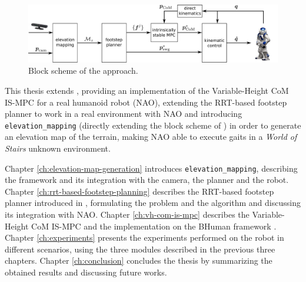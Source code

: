 \begin{figure}
  \centering
  \includegraphics[width=\textwidth]{figures/BlockScheme.pdf}
  \caption{Block scheme of the approach.}
  \label{fig:block-scheme}
\end{figure}

This thesis extends \cite{ECC19}, providing an implementation of the
Variable-Height CoM IS-MPC for a real humanoid robot (NAO), extending the 
RRT-based footstep planner to work in a real environment with NAO and 
introducing \texttt{elevation\_mapping} (directly extending the block scheme
of \cite{ECC19}) in order to generate an elevation map of the terrain,
making NAO able to execute gaits in a \textit{World of Stairs} unknown
environment.

Chapter \ref{ch:elevation-map-generation} introduces
\texttt{elevation\_mapping}, describing the framework and its integration with
the camera, the planner and the robot. Chapter
\ref{ch:rrt-based-footstep-planning} describes the RRT-based footstep planner
introduced in \cite{ECC19}, formulating the problem and the algorithm and
discussing its integration with NAO. Chapter \ref{ch:vh-com-is-mpc} describes
the Variable-Height CoM IS-MPC and the implementation on the BHuman framework
\cite{BHumanCodeRelease2018}. Chapter \ref{ch:experiments} presents the
experiments performed on the robot in different scenarios, using the three
modules described in the previous three chapters. Chapter \ref{ch:conclusion}
concludes the thesis by summarizing the obtained results and discussing
future works.

